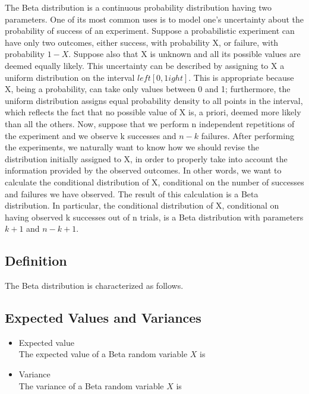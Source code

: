 
The Beta distribution is a continuous probability distribution having two parameters. One of its most common uses is to model one's uncertainty about the probability of success of an experiment.
Suppose a probabilistic experiment can have only two outcomes, either success, with probability  X, or failure, with probability  $1-X$. Suppose also that  X is unknown and all its possible values are deemed equally likely. This uncertainty can be described by assigning to  X a uniform distribution on the interval  $left[ 0,1
ight] $. This is appropriate because  X, being a probability, can take only values between  0 and  1; furthermore, the uniform distribution assigns equal probability density to all points in the interval, which reflects the fact that no possible value of  X is, a priori, deemed more likely than all the others. Now, suppose that we perform  n independent repetitions of the experiment and we observe  k successes and  $n-k$ failures. After performing the experiments, we naturally want to know how we should revise the distribution initially assigned to  X, in order to properly take into account the information provided by the observed outcomes. In other words, we want to calculate the conditional distribution of  X, conditional on the number of successes and failures we have observed. The result of this calculation is a Beta distribution. In particular, the conditional distribution of  X, conditional on having observed  k successes out of  n trials, is a Beta distribution with parameters  $k+1$ and  $n-k+1$.

\subsection{Definition}
The Beta distribution is characterized as follows.


\subsection{Expected Values and Variances}
\begin{itemize}
\item Expected value\\
The expected value of a Beta random variable $X$ is

\item Variance\\
The variance of a Beta random variable $X$ is
\end{itemize}
